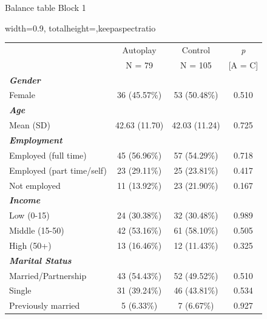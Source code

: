 \documentclass[aspectratio=169,xcolor=dvipsnames]{beamer}
\begin{document}
\begin{frame}{Balance table Block 1}
  \begin{table}
    \begin{adjustbox}{width=0.9\textwidth, totalheight=\baselineskip,keepaspectratio}
      \centering
      \begin{threeparttable}
        \begin{tabular*}{\textwidth}{@{\extracolsep{\fill}}lcc c@{}}
          \toprule
          & \multicolumn{1}{c}{Autoplay} & \multicolumn{1}{c}{Control} & \multicolumn{1}{c}{\textit{p}} \\
          & \multicolumn{1}{c}{N = 79} & \multicolumn{1}{c}{N = 105} & [A = C]\\
          \midrule
          \textit{\textbf{Gender}} & & & \\
          Female & 36 (45.57\%) & 53 (50.48\%) & 0.510 \\ \midrule
          \textit{\textbf{Age}} & & & \\
          Mean (SD) & 42.63 (11.70) & 42.03 (11.24) & 0.725 \\ \midrule
          \textit{\textbf{Employment}} & & & \\
          Employed (full time) & 45 (56.96\%) & 57 (54.29\%) & 0.718 \\
          Employed (part time/self) & 23 (29.11\%) & 25 (23.81\%) & 0.417 \\
          Not employed & 11 (13.92\%) & 23 (21.90\%) & 0.167 \\ \midrule
          \textit{\textbf{Income}} & & & \\
          Low (0-15) & 24 (30.38\%) & 32 (30.48\%) & 0.989 \\
          Middle (15-50) & 42 (53.16\%) & 61 (58.10\%) & 0.505 \\
          High (50+) & 13 (16.46\%) & 12 (11.43\%) & 0.325 \\ \midrule
          \textit{\textbf{Marital Status}} & & & \\
          Married/Partnership & 43 (54.43\%) & 52 (49.52\%) & 0.510 \\
          Single & 31 (39.24\%) & 46 (43.81\%) & 0.534 \\
          Previously married & 5 (6.33\%) & 7 (6.67\%) & 0.927 \\
          \bottomrule
        \end{tabular*}
        \label{table2}
      \end{threeparttable}
    \end{adjustbox}
  \end{table}
\end{frame}
\end{document}
